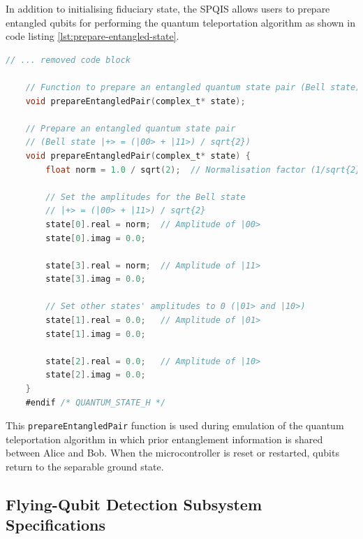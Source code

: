 In addition to initialising fiduciary state, the SPQIS allows users to prepare entangled qubits for performing the quantum teleportation algorithm as shown in code listing \ref{lst:prepare-entangled-state}.

\begin{lstlisting}[language=C, caption={Further code from the \textit{quantum\_state.h} C header file for peparing EPR pairs.}, label={lst:prepare-entangled-state}]
	// ... removed code block
	
	// Function to prepare an entangled quantum state pair (Bell state)
	void prepareEntangledPair(complex_t* state);
	
	// Prepare an entangled quantum state pair 
	// (Bell state |+> = (|00> + |11>) / sqrt{2})
	void prepareEntangledPair(complex_t* state) {
		float norm = 1.0 / sqrt(2);  // Normalisation factor (1/sqrt{2})
		
		// Set the amplitudes for the Bell state
		// |+> = (|00> + |11>) / sqrt{2}
		state[0].real = norm;  // Amplitude of |00>
		state[0].imag = 0.0;
		
		state[3].real = norm;  // Amplitude of |11>
		state[3].imag = 0.0;
		
		// Set other states' amplitudes to 0 (|01> and |10>)
		state[1].real = 0.0;   // Amplitude of |01>
		state[1].imag = 0.0;
		
		state[2].real = 0.0;   // Amplitude of |10>
		state[2].imag = 0.0;
	}
	#endif /* QUANTUM_STATE_H */
\end{lstlisting}
This \texttt{prepareEntangledPair} function is used during emulation of the quantum teleportation algorithm in which prior entanglement information is shared between Alice and Bob. When the microcontroller is reset or restarted, qubits return to the separable ground state. 
 
\subsection{Flying-Qubit Detection Subsystem Specifications \label{subsec:fqds-specs}}

